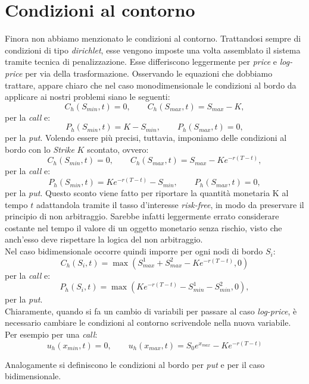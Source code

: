 \documentclass[a4paper,10pt]{report}
\theoremstyle{plain}
\theoremstyle{definition}
\theoremstyle{remark}
\begin{document}
\section{Condizioni al contorno}
Finora non abbiamo menzionato le condizioni al contorno. Trattandosi sempre di condizioni di tipo \emph{dirichlet}, esse vengono imposte una volta assemblato il sistema tramite tecnica di penalizzazione. Esse differiscono leggermente per \emph{price} e \emph{log-price} per via della trasformazione. Osservando le equazioni che dobbiamo trattare, appare chiaro che nel caso monodimensionale le condizioni al bordo da applicare ai nostri problemi siano le seguenti: $$C_h(S_{min},t)=0, \qquad C_h(S_{max},t)=S_{max}-K,$$ per la \emph{call} e:
\begin{equation}
\label{putam_cc}
P_h(S_{min},t)=K-S_{min}, \qquad P_h(S_{max},t)=0,
\end{equation}
per la \emph{put}. Volendo essere pi\`u precisi, tuttavia, imponiamo delle condizioni al bordo con lo \emph{Strike} $K$ scontato, ovvero: $$C_h(S_{min},t)=0, \qquad C_h(S_{max},t)=S_{max}-Ke^{-r(T-t)},$$ per la \emph{call} e: $$P_h(S_{min},t)=Ke^{-r(T-t)}-S_{min}, \qquad P_h(S_{max},t)=0,$$ per la \emph{put}. Questo sconto viene fatto per riportare la quantità monetaria K al tempo $t$ adattandola tramite il tasso d'interesse \emph{risk-free}, in modo da preservare il principio di non arbitraggio. Sarebbe infatti leggermente errato considerare costante nel tempo il valore di un oggetto monetario senza rischio, visto che anch'esso deve rispettare la logica del non arbitraggio.\\Nel caso bidimensionale occorre quindi imporre per ogni nodi di bordo $S_i$: $$C_h(S_i,t)=\max\left(S^1_{max}+S^2_{max}-Ke^{-r(T-t)},0\right)$$per la \emph{call} e: $$P_h(S_i,t)=\max\left(Ke^{-r(T-t)}-S^1_{min}-S^2_{min},0\right),$$ per la \emph{put}.\\
Chiaramente, quando si fa un cambio di variabili per passare al caso \emph{log-price}, è necessario cambiare le condizioni al contorno scrivendole nella nuova variabile. Per esempio per una \emph{call}:
\begin{equation*}
 u_h(x_{min},t)=0, \qquad u_h(x_{max},t)=S_0 e^{x_{max}}-Ke^{-r(T-t)}
\end{equation*}

Analogamente si definiscono le condizioni al bordo per \emph{put} e per il caso bidimensionale.
\end{document}
